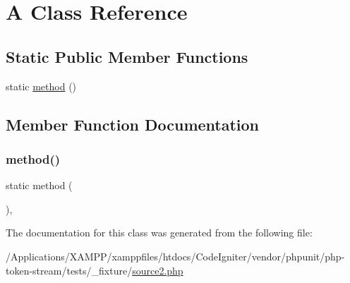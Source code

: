\hypertarget{class_a}{}\section{A Class Reference}
\label{class_a}
\subsection*{Static Public Member Functions}
\begin{DoxyCompactItemize}
\item 
static \mbox{\hyperlink{class_a_a62dd5e8e38162737597eb9549e35d433}{method}} ()
\end{DoxyCompactItemize}


\subsection{Member Function Documentation}
\mbox{\label{class_a_a62dd5e8e38162737597eb9549e35d433}} 
\subsubsection{\texorpdfstring{method()}{method()}}
{\footnotesize\ttfamily static method (\begin{DoxyParamCaption}{ }\end{DoxyParamCaption})\hspace{0.3cm}{\ttfamily [static]}, {\ttfamily [abstract]}}



The documentation for this class was generated from the following file\+:\begin{DoxyCompactItemize}
\item 
/\+Applications/\+X\+A\+M\+P\+P/xamppfiles/htdocs/\+Code\+Igniter/vendor/phpunit/php-\/token-\/stream/tests/\+\_\+fixture/\mbox{\hyperlink{source2_8php}{source2.\+php}}\end{DoxyCompactItemize}
